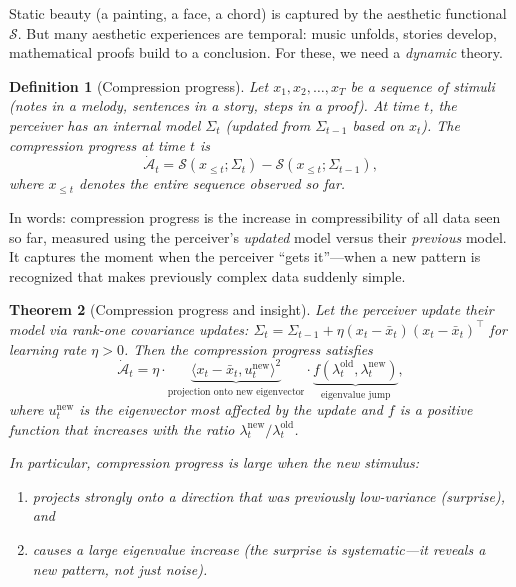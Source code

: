 \documentclass[journal]{IEEEtran}
\newtheorem{theorem}{Theorem}
\newtheorem{definition}[theorem]{Definition}
\newcommand{\ip}[2]{\langle #1, #2 \rangle}
\begin{document}
Static beauty (a painting, a face, a chord) is captured by the
aesthetic functional $\mathcal{S}$.  But many aesthetic experiences
are temporal: music unfolds, stories develop, mathematical proofs
build to a conclusion.  For these, we need a \emph{dynamic} theory.

\begin{definition}[Compression progress]
\label{def:progress}
Let $x_1, x_2, \ldots, x_T$ be a sequence of stimuli (notes in a
melody, sentences in a story, steps in a proof).  At time $t$, the
perceiver has an internal model $\Sigma_t$ (updated from
$\Sigma_{t-1}$ based on $x_t$).  The \emph{compression progress} at
time $t$ is
\begin{equation}
    \dot{\mathcal{A}}_t = \mathcal{S}(x_{\leq t}; \Sigma_t)
    - \mathcal{S}(x_{\leq t}; \Sigma_{t-1}),
    \label{eq:progress}
\end{equation}
where $x_{\leq t}$ denotes the entire sequence observed so far.
\end{definition}

In words: compression progress is the increase in compressibility
of all data seen so far, measured using the perceiver's \emph{updated}
model versus their \emph{previous} model.  It captures the moment
when the perceiver ``gets it''---when a new pattern is recognized that
makes previously complex data suddenly simple.

\begin{theorem}[Compression progress and insight]
\label{thm:progress}
Let the perceiver update their model via rank-one covariance updates:
$\Sigma_t = \Sigma_{t-1} + \eta (x_t - \bar{x}_t)(x_t -
\bar{x}_t)^\top$ for learning rate $\eta > 0$.  Then the compression
progress satisfies
\begin{equation}
    \dot{\mathcal{A}}_t = \eta \cdot
    \underbrace{\ip{x_t - \bar{x}_t}{u_t^{\mathrm{new}}}^2}_{\text{projection onto new eigenvector}}
    \cdot
    \underbrace{f(\lambda_t^{\mathrm{old}}, \lambda_t^{\mathrm{new}})}_{\text{eigenvalue jump}},
    \label{eq:progress_formula}
\end{equation}
where $u_t^{\mathrm{new}}$ is the eigenvector most affected by the
update and $f$ is a positive function that increases with the ratio
$\lambda_t^{\mathrm{new}} / \lambda_t^{\mathrm{old}}$.

In particular, compression progress is large when the new stimulus:
\begin{enumerate}
    \item projects strongly onto a direction that was previously
    low-variance (surprise), and
    \item causes a large eigenvalue increase (the surprise is
    \emph{systematic}---it reveals a new pattern, not just noise).
\end{enumerate}
\end{theorem}
\end{document}
